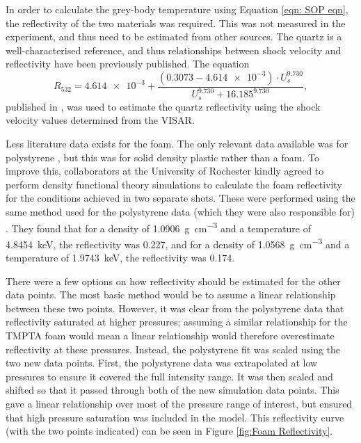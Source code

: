 In order to calculate the grey-body temperature using Equation \ref{eqn: SOP eqn}, the reflectivity of the two materials was required. This was not measured in the experiment, and thus need to be estimated from other sources. The quartz is a well-characterised reference, and thus relationships between shock velocity and reflectivity have been previously published. The equation \begin{equation} \label{eqn:QuartzR} R_{532} = \num{4.614e-3} + \frac{ (0.3073 - \num{4.614e-3})\cdot U_s^{9.730}}{U_s^{9.730} + 16.185^{9.730}}, \end{equation} published in \cite{Millot2015}, was used to estimate the quartz reflectivity using the shock velocity values determined from the VISAR.

Less literature data exists for the foam. The only relevant data available was for polystyrene \cite{Hu2014}, but this was for solid density plastic rather than a foam. To improve this, collaborators at the University of Rochester kindly agreed to perform density functional theory simulations to calculate the foam reflectivity for the conditions achieved in two separate shots. These were performed using the same method used for the polystyrene data (which they were also responsible for) \cite{Hu2014, Hu2017}. They found that for a density of 1.0906~\unit{\gram\per\centi\meter\cubed} and a temperature of 4.8454~\unit{\kilo\electronvolt}, the reflectivity was 0.227, and for a density of 1.0568~\unit{\gram\per\centi\meter\cubed} and a temperature of 1.9743~\unit{\kilo\electronvolt}, the reflectivity was 0.174. 

There were a few options on how reflectivity should be estimated for the other data points. The most basic method would be to assume a linear relationship between these two points. However, it was clear from the polystyrene data that reflectivity saturated at higher pressures; assuming a similar relationship for the TMPTA foam would mean a linear relationship would therefore overestimate reflectivity at these pressures. Instead, the polystyrene fit was scaled using the two new data points. First, the polystyrene data was extrapolated at low pressures to ensure it covered the full intensity range. It was then scaled and shifted so that it passed through both of the new simulation data points. This gave a linear relationship over most of the pressure range of interest, but ensured that high pressure saturation was included in the model. This reflectivity curve (with the two points indicated) can be seen in Figure \ref{fig:Foam Reflectivity}.

